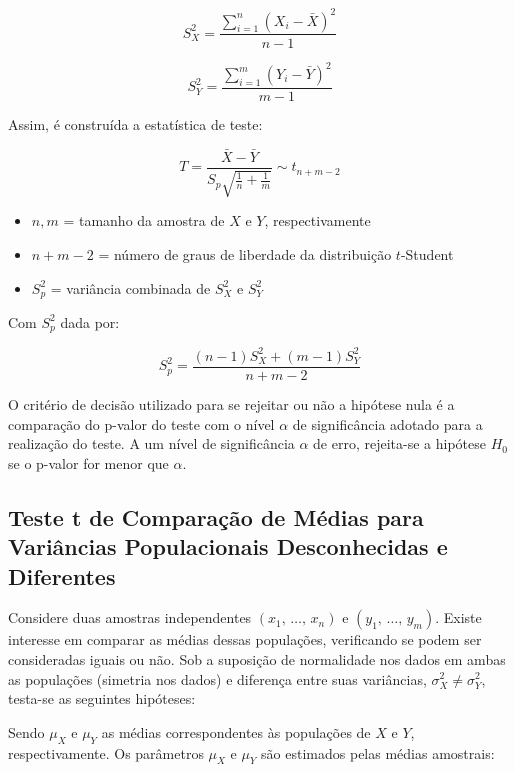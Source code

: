 \documentclass[
]{estat/estat}
\providecommand{\tightlist}{%
  \setlength{\itemsep}{0pt}\setlength{\parskip}{0pt}}\usepackage{longtable,booktabs,array}
\begin{document}
\[
S_X^2 = \frac{\sum_{i=1}^{n} (X_i - \bar{X})^2}{n-1}
\]

\[
S_Y^2 = \frac{\sum_{i=1}^{m} (Y_i - \bar{Y})^2}{m-1}
\]

Assim, é construída a estatística de teste:

\[
T = \frac{\bar{X} - \bar{Y}}{S_p \sqrt{\frac{1}{n} + \frac{1}{m}}} \sim t_{n+m-2}
\]

\begin{itemize}
\tightlist
\item
  \(n, m\) = tamanho da amostra de \(X\) e \(Y\), respectivamente
\item
  \(n+m-2\) = número de graus de liberdade da distribuição \(t\)-Student
\item
  \(S_p^2\) = variância combinada de \(S_X^2\) e \(S_Y^2\)
\end{itemize}

Com \(S_p^2\) dada por:

\[
S_p^2 = \frac{(n-1)S^2_X + (m-1)S^2_Y}{n+m-2}
\]

O critério de decisão utilizado para se rejeitar ou não a hipótese nula
é a comparação do p-valor do teste com o nível \(\alpha\) de
significância adotado para a realização do teste. A um nível de
significância \(\alpha\) de erro, rejeita-se a hipótese \(H_{0}\) se o
p-valor for menor que \(\alpha\).

\hypertarget{teste-t-de-comparauxe7uxe3o-de-muxe9dias-para-variuxe2ncias-populacionais-desconhecidas-e-diferentes}{%
\subsection{Teste t de Comparação de Médias para Variâncias
Populacionais Desconhecidas e
Diferentes}\label{teste-t-de-comparauxe7uxe3o-de-muxe9dias-para-variuxe2ncias-populacionais-desconhecidas-e-diferentes}}

Considere duas amostras independentes \((x_1,\, \ldots , \, x_n)\) e
\((y_1,\, \ldots , \, y_m)\). Existe interesse em comparar as médias
dessas populações, verificando se podem ser consideradas iguais ou não.
Sob a suposição de normalidade nos dados em ambas as populações
(simetria nos dados) e diferença entre suas variâncias,
\(\sigma_X^2 \neq \sigma_Y^2\), testa-se as seguintes hipóteses:


Sendo \(\mu_X\) e \(\mu_Y\) as médias correspondentes às populações de
\(X\) e \(Y\), respectivamente. Os parâmetros \(\mu_X\) e \(\mu_Y\) são
estimados pelas médias amostrais:
\end{document}
